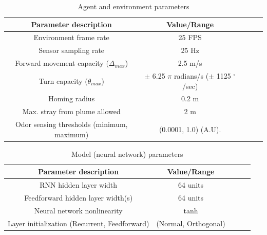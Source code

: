 \documentclass[5p,twocolumn,authoryear]{elsarticle}
\begin{document}
\begin{table}[h!]
    \centering
    \begin{tabular}{ccccc}
     \hline\hline
     \textbf{Parameter description} & \textbf{Value/Range} \\
     \hline   
       Environment frame rate  & 25 FPS  \\ \hline
       Sensor sampling rate & 25 Hz  \\ \hline
       Forward movement capacity ($\Delta_{max}$) & 2.5 m/s  \\ \hline
       Turn capacity ($\theta_{max}$) & $\pm$ 6.25 $\pi$ radians/s ($\pm$ 1125 $^\circ$/sec)  \\ \hline
       Homing radius & 0.2 m  \\ \hline
       Max. stray from plume allowed & 2 m  \\ \hline
       Odor sensing thresholds (minimum, maximum) & (0.0001, 1.0) (A.U).  \\ \hline
     \hline
    \end{tabular}
    \caption{Agent and environment parameters}
    \label{table_supp_agent_env}
\end{table}

\begin{table}[h!]
    \centering
    \begin{tabular}{ccccc}
     \hline\hline
     \textbf{Parameter description} & \textbf{Value/Range} \\
     \hline   
       RNN hidden layer width & 64 units  \\ \hline
       Feedforward hidden layer width(s) & 64 units  \\ \hline
       Neural network nonlinearity & tanh  \\ \hline
       Layer initialization (Recurrent, Feedforward) & (Normal, Orthogonal)  \\ \hline
     \hline
    \end{tabular}
    \caption{Model (neural network) parameters}
    \label{table_supp_nn}
\end{table}
\end{document}
